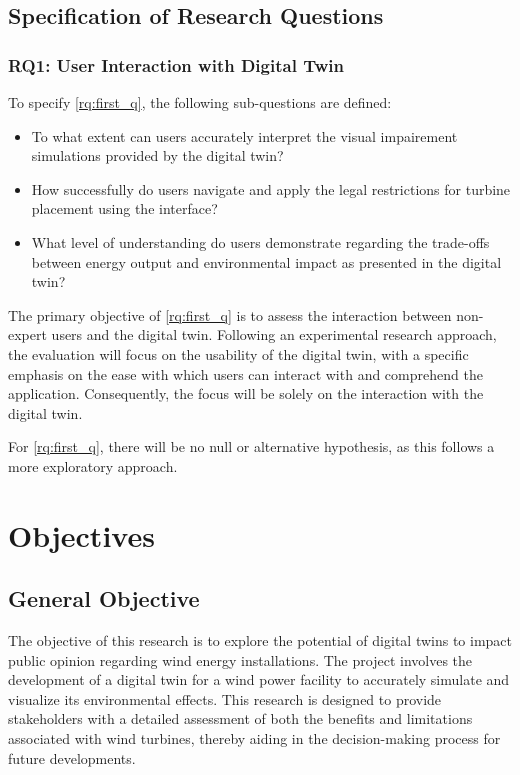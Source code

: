 \documentclass[11pt, titlepage, a4paper]{scrartcl}
\begin{document}
\begin{linenumbers}
    \subsection{Specification of Research Questions}

    \subsubsection{RQ1: User Interaction with Digital Twin}

    To specify \ref{rq:first_q}, the following sub-questions are defined:

    \begin{itemize}[label={--}]
        \item To what extent can users accurately interpret the visual impairement simulations provided by the digital twin?
        \item How successfully do users navigate and apply the legal restrictions for turbine placement using the interface?
        \item What level of understanding do users demonstrate regarding the trade-offs between energy output and environmental impact as presented in the digital twin?
    \end{itemize}

    The primary objective of \ref{rq:first_q} is to assess the interaction between non-expert users and the digital twin. Following an experimental research approach, the evaluation will focus on the usability of the digital twin, with a specific emphasis on the ease with which users can interact with and comprehend the application. Consequently, the focus will be solely on the interaction with the digital twin.

    For \ref{rq:first_q}, there will be no null or alternative hypothesis, as this follows a more exploratory approach.


    \section{Objectives}
    \subsection{General Objective}
    The objective of this research is to explore the potential of digital twins to impact public opinion regarding wind energy installations. The project involves the development of a digital twin for a wind power facility to accurately simulate and visualize its environmental effects. This research is designed to provide stakeholders with a detailed assessment of both the benefits and limitations associated with wind turbines, thereby aiding in the decision-making process for future developments.


\end{linenumbers}
\end{document}
